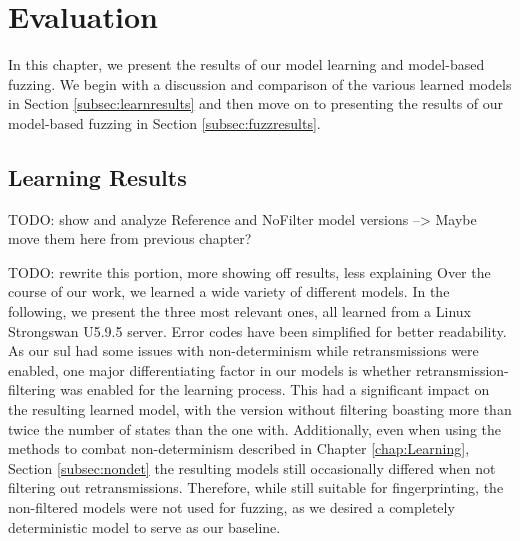 %
%
% 
% 
% 

\chapter{Evaluation} \label{chap:Evaluation}

In this chapter, we present the results of our model learning and model-based fuzzing. We begin with a discussion and comparison of the various learned models in Section \ref{subsec:learnresults} and then move on to presenting the results of our model-based fuzzing in Section \ref{subsec:fuzzresults}.



\section{Learning Results} \label{sec:learnresults}
TODO: show and analyze Reference and NoFilter model versions --> Maybe move them here from previous chapter?

TODO: rewrite this portion, more showing off results, less explaining
Over the course of our work, we learned a wide variety of different models. In the following, we present the three most relevant ones, all learned from a Linux Strongswan U5.9.5 server. Error codes have been simplified for better readability. As our \ac{sul} had some issues with non-determinism while retransmissions were enabled, one major differentiating factor in our models is whether retransmission-filtering was enabled for the learning process. This had a significant impact on the resulting learned model, with the version without filtering boasting more than twice the number of states than the one with. Additionally, even when using the methods to combat non-determinism described in Chapter \ref{chap:Learning}, Section \ref{subsec:nondet} the resulting models still occasionally differed when not filtering out retransmissions. Therefore, while still suitable for fingerprinting, the non-filtered models were not used for fuzzing, as we desired a completely deterministic model to serve as our baseline.

